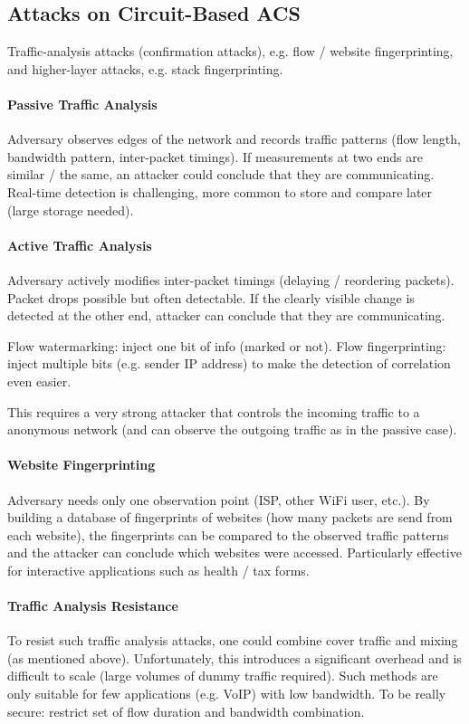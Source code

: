 \subsection{Attacks on Circuit-Based ACS}

Traffic-analysis attacks (confirmation attacks), e.g. flow / website fingerprinting, and higher-layer attacks, e.g. stack fingerprinting.

\paragraph{Passive Traffic Analysis}
Adversary observes edges of the network and records traffic patterns (flow length, bandwidth pattern, inter-packet timings). If measurements at two ends are similar / the same, an attacker could conclude that they are communicating. Real-time detection is challenging, more common to store and compare later (large storage needed).

\paragraph{Active Traffic Analysis}
Adversary actively modifies inter-packet timings (delaying / reordering packets). Packet drops possible but often detectable. If the clearly visible change is detected at the other end, attacker can conclude that they are communicating.

Flow watermarking: inject one bit of info (marked or not). Flow fingerprinting: inject multiple bits (e.g. sender IP address) to make the detection of correlation even easier. 

This requires a very strong attacker that controls the incoming traffic to a anonymous network (and can observe the outgoing traffic as in the passive case).

\paragraph{Website Fingerprinting}
Adversary needs only one observation point (ISP, other WiFi user, etc.). By building a database of fingerprints of websites (how many packets are send from each website), the fingerprints can be compared to the observed traffic patterns and the attacker can conclude which websites were accessed. Particularly effective for interactive applications such as health / tax forms. 

\paragraph{Traffic Analysis Resistance}
To resist such traffic analysis attacks, one could combine cover traffic and mixing (as mentioned above). Unfortunately, this introduces a significant overhead and is difficult to scale (large volumes of dummy traffic required). Such methods are only suitable for few applications (e.g. VoIP) with low bandwidth. To be really secure: restrict set of flow duration and bandwidth combination.

